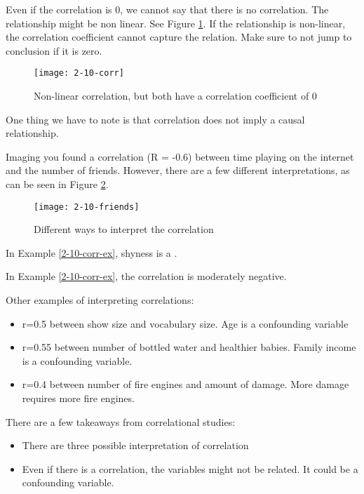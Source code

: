 \documentclass[../main/main.tex]{subfiles}
\begin{document}
\begin{remark}
Even if the correlation is 0, we cannot say that there is no correlation. The relationship might be non linear. See Figure \ref{2-10-corr}. If the relationship is non-linear, the correlation coefficient cannot capture the relation. Make sure to not jump to conclusion if it is zero.
\end{remark}
\begin{figure}[htpb]
  \centering
  \texttt{[image: 2-10-corr]}
  \caption{Non-linear correlation, but both have a correlation coefficient of 0}
  \label{2-10-corr}
\end{figure}
One thing we have to note is that correlation does not imply a causal relationship.
\begin{example}
  \label{2-10-corr-ex}
  Imaging you found a correlation (R = -0.6) between time playing on the internet and the number of friends. However, there are a few different interpretations, as can be seen in Figure \ref{2-10-friends}.
\end{example}
  \begin{figure}[htpb]
	\centering
	\texttt{[image: 2-10-friends]}
	\caption{Different ways to interpret the correlation}
	\label{2-10-friends}
  \end{figure}
\begin{definition}
In Example \ref{2-10-corr-ex}, shyness is a .
\end{definition}
\begin{remark}
In Example \ref{2-10-corr-ex}, the correlation is moderately negative.
\end{remark}
\begin{example}
  Other examples of interpreting correlations:
  \begin{itemize}
    \item r=0.5 between show size and vocabulary size. Age is a confounding variable
          \item r=0.55 between number of bottled water and healthier babies. Family income is a confounding variable.
          \item r=0.4 between number of fire engines and amount of damage. More damage requires more fire engines.
  \end{itemize}
\end{example}
There are a few takeaways from correlational studies:
\begin{itemize}
        \item There are three possible interpretation of correlation
\item Even if there is a correlation, the variables might not be related. It could be a confounding variable.
\end{itemize}
\end{document}
